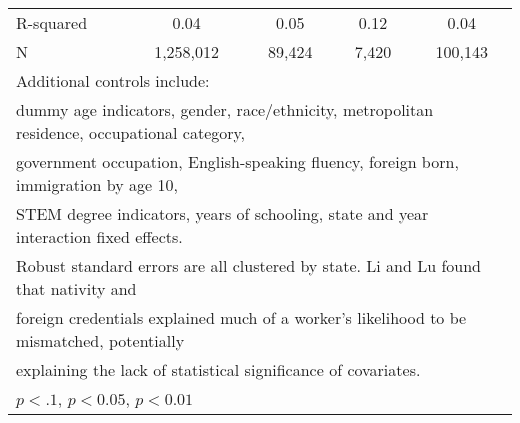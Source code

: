 \begin{table}[htbp]
\begin{tabular}{l*{4}{c}}
R-squared           &        0.04         &        0.05         &        0.12         &        0.04         \\
N                   &   1,258,012         &      89,424         &       7,420         &     100,143         \\
\bottomrule
\multicolumn{5}{l}{\footnotesize Additional controls include:}\\
\multicolumn{5}{l}{\footnotesize dummy age indicators, gender, race/ethnicity, metropolitan residence, occupational category,}\\
\multicolumn{5}{l}{\footnotesize government occupation, English-speaking fluency, foreign born, immigration by age 10,}\\
\multicolumn{5}{l}{\footnotesize STEM degree indicators, years of schooling, state and year interaction fixed effects.}\\
\multicolumn{5}{l}{\footnotesize Robust standard errors are all clustered by state. Li and Lu found that nativity and}\\
\multicolumn{5}{l}{\footnotesize foreign credentials explained much of a worker's likelihood to be mismatched, potentially}\\
\multicolumn{5}{l}{\footnotesize explaining the lack of statistical significance of covariates.}\\
\multicolumn{5}{l}{\footnotesize \sym{*} \(p<.1\), \sym{**} \(p<0.05\), \sym{***} \(p<0.01\)}\\
\end{tabular}
\end{table}
